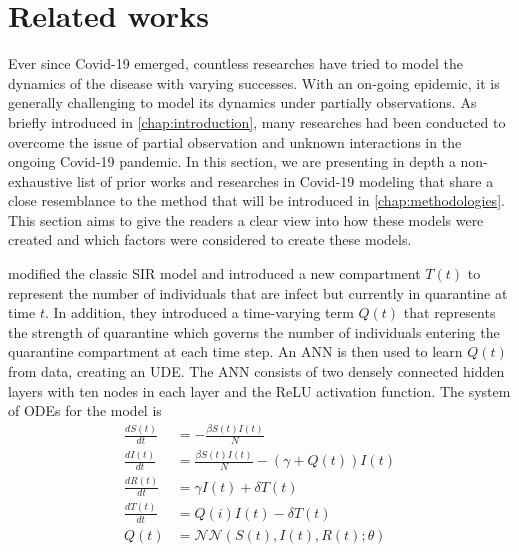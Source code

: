 \section{Related works}

Ever since Covid-19 emerged, countless researches have tried to model the dynamics of the disease with varying successes.
With an on-going epidemic, it is generally challenging to model its dynamics under partially observations.
As briefly introduced in \autoref{chap:introduction}, many researches had been conducted to overcome the issue of partial observation and unknown interactions in the ongoing Covid-19 pandemic.
In this section, we are presenting in depth a non-exhaustive list of prior works and researches in Covid-19 modeling that share a close resemblance to the method that will be introduced in \autoref{chap:methodologies}.
This section aims to give the readers a clear view into how these models were created and which factors were considered to create these models.

\cite{dandekarMachineLearningAidedGlobal2020a} modified the classic \gls{SIR} model and introduced a new compartment $T(t)$ to represent the number of individuals that are infect but currently in quarantine at time $t$.
In addition, they introduced a time-varying term $Q(t)$ that represents the strength of quarantine which governs the number of individuals entering the quarantine compartment at each time step.
An \gls{ANN} is then used to learn $Q(t)$ from data, creating an \gls{UDE}.
The \gls{ANN} consists of two densely connected hidden layers with ten nodes in each layer and the \gls{ReLU} activation function.
The system of \glspl{ODE} for the model is
\begin{align*}
    \frac{dS(t)}{dt} &= -\frac{\beta S(t) I(t)}{N} \\
    \frac{dI(t)}{dt} &= \frac{\beta S(t) I(t)}{N}  - (\gamma + Q(t)) I(t) \\
    \frac{dR(t)}{dt} &= \gamma I(t) + \delta T(t) \\
    \frac{dT(t)}{dt} &= Q(i)I(t) - \delta T(t) \\
    Q(t) &= \mathcal{NN}(S(t),I(t),R(t); \theta)
\end{align*}

